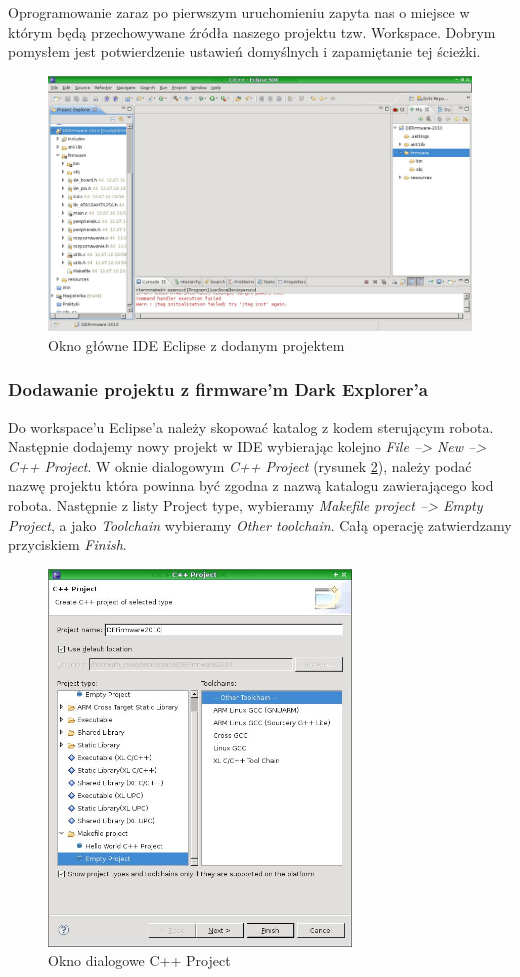 Oprogramowanie zaraz po pierwszym uruchomieniu zapyta nas o miejsce w którym będą przechowywane źródła naszego projektu tzw. Workspace. Dobrym pomysłem jest potwierdzenie ustawień domyślnych i zapamiętanie tej ścieżki.

\begin{figure}
 \centering
 \includegraphics[width=150.0mm]{../images/Eclipse-MainWindow.jpg}
 \caption{Okno główne IDE Eclipse z dodanym projektem}
 \label{fig:Eclipse-MainWindow}
\end{figure}

\subsubsection{Dodawanie projektu z firmware'm Dark Explorer'a}
Do workspace'u Eclipse'a należy skopować katalog z kodem sterującym robota. Następnie dodajemy nowy projekt w IDE wybierając kolejno \textit{File --> New --> C++ Project}. W oknie dialogowym \textit{C++ Project} (rysunek \ref{fig:Eclipse-CPP-Project}), należy podać nazwę projektu która powinna być zgodna z nazwą katalogu zawierającego kod robota. Następnie z listy Project type, wybieramy \textit{Makefile project --> Empty Project}, a jako \textit{Toolchain} wybieramy \textit{Other toolchain}. Całą operację zatwierdzamy przyciskiem \textit{Finish}.

\begin{figure}
 \centering
 \includegraphics[height=100.0mm]{../images/Eclipse-CPP-Project.jpg}
 \caption{Okno dialogowe C++ Project}
 \label{fig:Eclipse-CPP-Project}
\end{figure}


